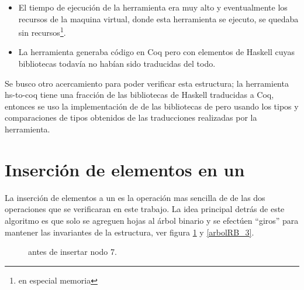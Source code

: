 \begin{itemize}
    \item El tiempo de ejecuci\'on de la herramienta era muy alto y eventualmente los recursos de
    la maquina virtual, donde esta herramienta se ejecuto, se quedaba sin recursos\footnote{en
    especial memoria}.
    \item La herramienta generaba c\'odigo en Coq pero con elementos de Haskell cuyas bibliotecas
    todavía no habían sido traducidas del todo.
\end{itemize}{}

Se busco otro acercamiento para poder verificar esta estructura; la herramienta hs-to-coq tiene
una fracci\'on de las bibliotecas de Haskell traducidas a Coq, entonces se uso la implementación de
{\arns} de las bibliotecas de {\coq}\cite{MSetRBT} pero usando los tipos y comparaciones de tipos
obtenidos de las traducciones realizadas por la herramienta.

\section{Inserción de elementos en un {\arn}}

La inserci\'on de elementos a un {\arn} es la operaci\'on mas sencilla de de las dos operaciones
que se verificaran en este trabajo. La idea principal detrás de este algoritmo es que solo se
agreguen hojas al \'arbol binario y se efectúen ``giros'' para mantener las invariantes de la
estructura, ver figura \ref{arbolRB_2} y \ref{arbolRB_3}.
\begin{figure}
\centering
\captionsetup{justification=centering}
\caption{{\Arn} antes de insertar nodo 7.}
\label{arbolRB_2}
\end{figure}

